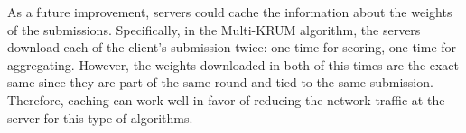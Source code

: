As a future improvement, servers could cache the information about the weights of the submissions. Specifically, in the Multi-KRUM algorithm, the servers download each of the client's submission twice: one time for scoring, one time for aggregating. However, the weights downloaded in both of this times are the exact same since they are part of the same round and tied to the same submission. Therefore, caching can work well in favor of reducing the network traffic at the server for this type of algorithms.

